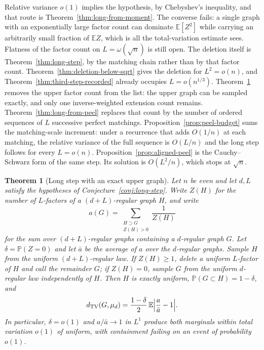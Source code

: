 \documentclass[11pt]{article}
\newtheorem{theorem}{Theorem}
\newcommand{\EE}{\mathbb{E}}
\newcommand{\PP}{\mathbb{P}}
\newcommand{\dTV}{d_{\mathrm{TV}}}
\begin{document}
Relative variance \(o(1)\) implies the hypothesis, by Chebyshev's inequality, and
that route is Theorem~\ref{thm:long-from-moment}.
The converse fails: a single graph with an exponentially large factor count
can dominate \(\EE[Z^2]\) while carrying an arbitrarily small fraction of
\(\EE Z\), which is all the total-variation estimate sees.
Flatness of the factor count on \(L=\omega(\sqrt{n})\) is still open.
The deletion itself is Theorem~\ref{thm:long-step}, by the matching chain
rather than by that factor count.
Theorem~\ref{thm:deletion-below-sqrt} gives the deletion for
\(L^2=o(n)\), and Theorem~\ref{thm:third-step-recorded} already
occupies \(L=o(n^{1/3})\).
Theorem~\ref{thm:long-exact-upper} removes the upper factor count from the list:
the upper graph can be sampled exactly, and only one inverse-weighted extension
count remains.
Theorem~\ref{thm:long-from-peel} replaces that count by the number of ordered
sequences of \(L\) successive perfect matchings.
Proposition~\ref{prop:peel-budget} sums the matching-scale increment: under a
recurrence that adds \(O(1/n)\) at each matching, the relative variance of the
full sequence is \(O(L/n)\) and the long step follows for every \(L=o(n)\).
Proposition~\ref{prop:aligned-peel} is the Cauchy--Schwarz form of the same
step. Its solution is \(O(L^2/n)\), which stops at \(\sqrt{n}\).

\begin{theorem}[Long step with an exact upper graph]
\label{thm:long-exact-upper}
Let \(n\) be even and let \(d,L\) satisfy the hypotheses of
Conjecture~\ref{conj:long-step}.
Write \(Z(H)\) for the number of \(L\)-factors of a \((d+L)\)-regular graph \(H\), and
write
\[
a(G)
=
\sum_{\substack{H\supset G\\ Z(H)>0}}\frac1{Z(H)}
\]
for the sum over \((d+L)\)-regular graphs containing a \(d\)-regular graph \(G\).
Let \(\delta=\PP(Z=0)\) and let \(\bar a\) be the average of \(a\) over the
\(d\)-regular graphs.
Sample \(H\) from the uniform \((d+L)\)-regular law.
If \(Z(H)\ge 1\), delete a uniform \(L\)-factor of \(H\) and call the remainder
\(G\); if \(Z(H)=0\), sample \(G\) from the uniform \(d\)-regular law
independently of \(H\).
Then \(H\) is exactly uniform, \(\PP(G\subset H)=1-\delta\), and
\[
\dTV(G,\mu_d)
=
\frac{1-\delta}{2}\,
\EE\Bigl|\frac{a}{\bar a}-1\Bigr|.
\]
In particular, \(\delta=o(1)\) and \(a/\bar a\to 1\) in \(L^1\) produce both
marginals within total variation \(o(1)\) of uniform, with containment failing
on an event of probability \(o(1)\).
\end{theorem}
\end{document}
